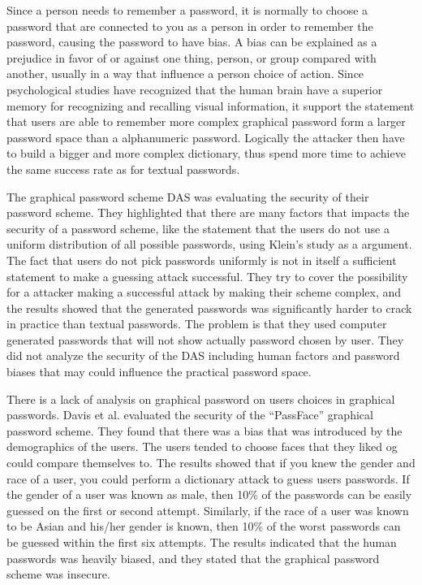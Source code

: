   Since a person needs to remember a password, it is normally to choose a password that are connected to you as a person in order to remember the password, causing the password to have bias. A bias can be explained as a prejudice in favor of or against one thing, person, or group compared with another, usually in a way that influence a person choice of action. Since psychological studies have recognized that the human brain have a superior memory for recognizing and recalling visual information, it support the statement that users are able to remember more complex graphical password form a larger password space than a alphanumeric password. Logically the attacker then have to build a bigger and more complex dictionary, thus spend more time to achieve the same success rate as for textual passwords. 

  The graphical password scheme DAS \cite{Jermyn} was evaluating the security of their password scheme. They highlighted that there are many factors that impacts the security of a password scheme, like the statement that the users do not use a uniform distribution of all possible passwords, using Klein's study \cite{UnixPasswords} as a argument. The fact that users do not pick passwords uniformly is not in itself a sufficient statement to make a guessing attack successful. They try to cover the possibility for a attacker making a successful attack by making their scheme complex, and the results showed that the generated passwords was significantly harder to crack in practice than textual passwords. The problem is that they used computer generated passwords that will not show actually password chosen by user. They did not analyze the security of the DAS including human factors and password biases that may could influence the practical password space. 

  There is a lack of analysis on graphical password on users choices in graphical passwords. Davis et al.\cite{Davis} evaluated the security of the ``PassFace'' graphical password scheme. They found that there was a bias that was introduced by the demographics of the users. The users tended to choose faces that they liked og could compare themselves to. The results showed that if you knew the gender and race of a user, you could perform a dictionary attack to guess users passwords. If the gender of a user was known as male, then 10\% of the passwords can be easily guessed on the first or second attempt. Similarly, if the race of a user was known to be Asian and his/her gender is known, then 10\% of the worst passwords can be guessed within the first six attempts. The results indicated that the human passwords was heavily biased, and they stated that the graphical password scheme was insecure. 

